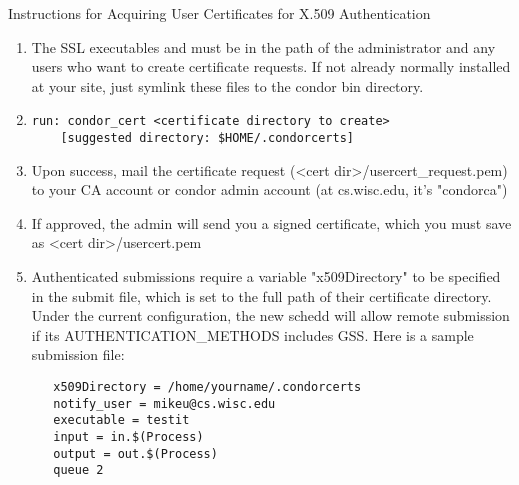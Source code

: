 Instructions for Acquiring User Certificates for X.509 Authentication

\begin{enumerate}
\item The SSL executables  and  must be in the path of the administrator and any users who want to create certificate requests. If not already normally installed at your site, just symlink these files to the condor bin directory.

\item
\begin{verbatim}
run: condor_cert <certificate directory to create> 
	[suggested directory: $HOME/.condorcerts]
\end{verbatim}

\item Upon success, mail the certificate request (<cert dir>/usercert\_request.pem) to your CA account or condor admin account (at cs.wisc.edu, it's "condorca")

\item If approved, the admin will send you a signed certificate, which you must save as <cert dir>/usercert.pem

\item Authenticated submissions require a variable "x509Directory" to be 
specified in the submit file, which is set to the full path of their 
certificate directory.  Under the current configuration, the new schedd will 
allow remote submission if its AUTHENTICATION\_METHODS includes GSS.  Here is 
a sample submission file:
\begin{verbatim}
   x509Directory = /home/yourname/.condorcerts
   notify_user = mikeu@cs.wisc.edu
   executable = testit
   input = in.$(Process)
   output = out.$(Process)
   queue 2
\end{verbatim}
\end{enumerate}

